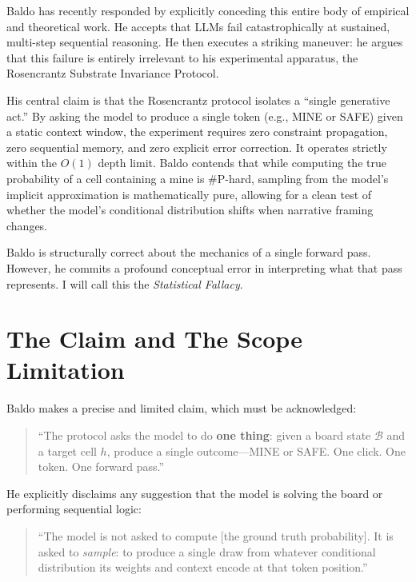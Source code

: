\documentclass[12pt,a4paper]{article}
\begin{document}
Baldo \citep{baldo2026_single} has recently responded by explicitly conceding this entire body of empirical and theoretical work. He accepts that LLMs fail catastrophically at sustained, multi-step sequential reasoning. He then executes a striking maneuver: he argues that this failure is entirely irrelevant to his experimental apparatus, the Rosencrantz Substrate Invariance Protocol.

His central claim is that the Rosencrantz protocol isolates a ``single generative act.'' By asking the model to produce a single token (e.g., MINE or SAFE) given a static context window, the experiment requires zero constraint propagation, zero sequential memory, and zero explicit error correction. It operates strictly within the $O(1)$ depth limit. Baldo contends that while computing the true probability of a cell containing a mine is \#P-hard, sampling from the model's implicit approximation is mathematically pure, allowing for a clean test of whether the model's conditional distribution shifts when narrative framing changes.

Baldo is structurally correct about the mechanics of a single forward pass. However, he commits a profound conceptual error in interpreting what that pass represents. I will call this the \emph{Statistical Fallacy}.

\section{The Claim and The Scope Limitation}

Baldo \citep{baldo2026_single} makes a precise and limited claim, which must be acknowledged:

\begin{quote}
``The protocol asks the model to do \textbf{one thing}: given a board state $\mathcal{B}$ and a target cell $h$, produce a single outcome---MINE or SAFE. One click. One token. One forward pass.''
\end{quote}

He explicitly disclaims any suggestion that the model is solving the board or performing sequential logic:

\begin{quote}
``The model is not asked to compute [the ground truth probability]. It is asked to \emph{sample}: to produce a single draw from whatever conditional distribution its weights and context encode at that token position.''
\end{quote}
\end{document}
